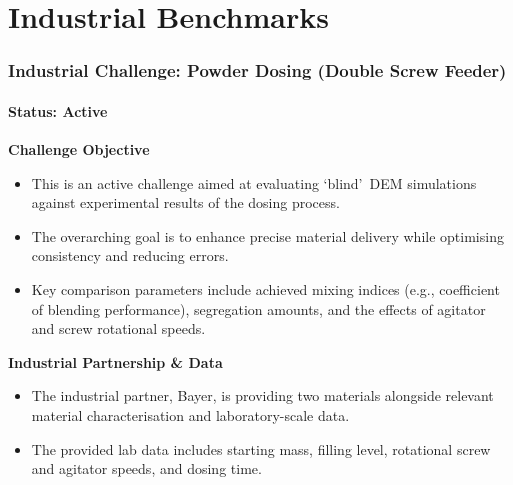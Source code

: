 \section{Industrial Benchmarks}
\begin{frame}
\frametitle{Industrial Challenge: Powder Dosing (Double Screw Feeder)}
\framesubtitle{Status: Active}

    \textbf{Challenge Objective}
    \begin{itemize}
        \item This is an active challenge aimed at evaluating \lq blind\rq\ DEM simulations against experimental results of the dosing process. 
        \item The overarching goal is to enhance precise material delivery while optimising consistency and reducing errors. 
        \item Key comparison parameters include achieved mixing indices (e.g., coefficient of blending performance), segregation amounts, and the effects of agitator and screw rotational speeds. 
    \end{itemize}

    \vspace{0.3cm}
    \textbf{Industrial Partnership \& Data}
    \begin{itemize}
        \item The industrial partner, Bayer, is providing two materials alongside relevant material characterisation and laboratory-scale data.
        \item The provided lab data includes starting mass, filling level, rotational screw and agitator speeds, and dosing time. 
    \end{itemize}
\end{frame}

